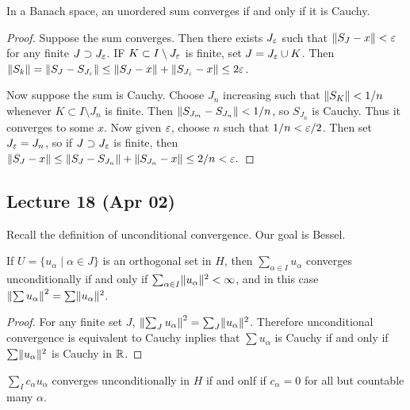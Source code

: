 \documentclass[10pt, twoside]{article}
\begin{document}
    \begin{lem}
        In a Banach space, an unordered sum converges if and only if it is Cauchy.
        \begin{proof}
            Suppose the sum converges. Then there exists $J_{\ep}$ such that $\norm{S_J - x} < \ep$ for any finite $J \supset J_{\ep}$. IF $K \subset I \setminus J_{\ep}$ is finite, set $J = J_{\ep} \cup K$. Then $\norm{S_k} = \norm{S_J - S_{J_{\ep}}} \leq \norm{S_J - x} + \norm{S_{J_{\ep}} - x} \leq 2 \ep$.

            Now suppose the sum is Cauchy. Choose $J_n$ increasing such that $\norm{S_K} < 1/n$ whenever $K \subset I \setminus J_n$ is finite. Then $\norm{S_{J_m} - S_{J_n}} < 1/n$, so $S_{J_n}$ is Cauchy. Thus it converges to some $x$. Now given $\ep$, choose $n$ such that $1/n < \ep/2$. Then set $J_{\ep} = J_n$, so if $J \supset J_{\ep}$ is finite, then $\norm{S_J - x} \leq \norm{S_J - S_{J_n}} + \norm{S_{J_n} - x} \leq 2/n < \ep.$
        \end{proof}
    \end{lem}

    \subsection{Lecture 18 (Apr 02)}
    Recall the definition of unconditional convergence. Our goal is Bessel.

    \begin{lem}
        If $U = \{u_{\alpha} \mid \alpha \in J \}$ is an orthogonal set in $H$, then $\sum_{\alpha \in I} u_{\alpha}$ converges unconditionally if and only if $\sum_{\alpha \in I} \norm{u_{\alpha}}^2 < \infty$, and in this case $\norm*{\sum u_{\alpha}}^2 = \sum \norm{u_{\alpha}}^2$.
        \begin{proof}
            For any finite set $J$, $\norm*{\sum_J u_{\alpha}}^2 = \sum_J \norm{u_{\alpha}}^2$. Therefore unconditional convergence is equivalent to Cauchy inplies that $\sum u_{\alpha}$ is Cauchy if and only if $\sum \norm{u_{\alpha}}^2$ is Cauchy in $\R$.
        \end{proof}
    \end{lem}

    \begin{cor}
        $\sum_I c_{\alpha} u_{\alpha}$ converges unconditionally in $H$ if and onlf if $c_{\alpha}=0$ for all but countable many $\alpha$.
    \end{cor}
\end{document}
